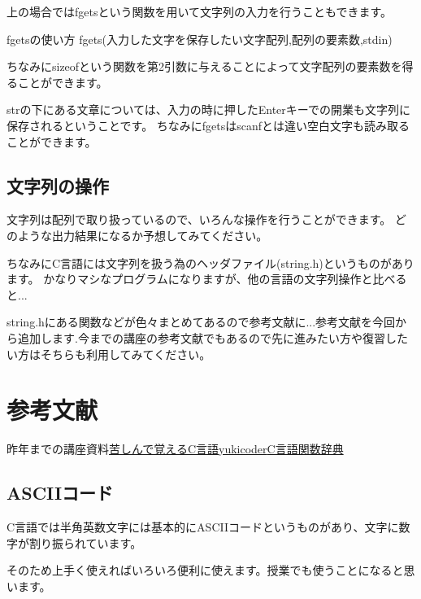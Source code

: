 

上の場合ではfgetsという関数を用いて文字列の入力を行うこともできます。

\begin{itembox}{fgetsの使い方}
fgets(入力した文字を保存したい文字配列,配列の要素数,stdin)
\end{itembox}

ちなみにsizeofという関数を第2引数に与えることによって文字配列の要素数を得ることができます。


strの下にある文章については、入力の時に押したEnterキーでの開業も文字列に保存されるということです。
ちなみにfgetsはscanfとは違い空白文字も読み取ることができます。

\subsection{文字列の操作}
文字列は配列で取り扱っているので、いろんな操作を行うことができます。
どのような出力結果になるか予想してみてください。

ちなみにC言語には文字列を扱う為のヘッダファイル(string.h)というものがあります。
かなりマシなプログラムになりますが、他の言語の文字列操作と比べると...


string.hにある関数などが色々まとめてあるので参考文献に...参考文献を今回から追加します.今までの講座の参考文献でもあるので先に進みたい方や復習したい方はそちらも利用してみてください。

\section*{参考文献}
\noindent
[1]昨年までの講座資料\newline
[2]\href{http://9cguide.appspot.com}{苦しんで覚えるC言語}\newline
[3]\href{https://yukicoder.me/}{yukicoder}\newline
[4]\href{http://www.c-tipsref.com/reference/string.html}{C言語関数辞典}

\subsection{ASCIIコード}
C言語では半角英数文字には基本的にASCIIコードというものがあり、文字に数字が割り振られています。

そのため上手く使えればいろいろ便利に使えます。授業でも使うことになると思います。



